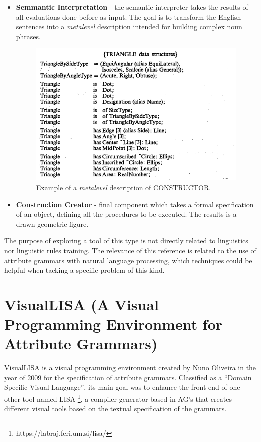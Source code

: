 \begin{itemize}
	\newpage
	\item \textbf{Semmantic Interpretation} - the semantic interpreter takes the results of all evaluations done before as input.
		The goal is to transform the English sentences into a \textit{metalevel} description intended for building complex noun phrases.
		\begin{figure}[h]
			\centering
			\includegraphics[width=12cm]{images/constructor_metalevel_desc.png}
			\caption{Example of a \textit{metalevel} description of CONSTRUCTOR.}
			\label{fig:constructorMetalevelDesc}
		\end{figure}
	
	\item \textbf{Construction Creator} - final component which takes a formal specification of an object, defining all the procedures to be executed.
		The results is a drawn geometric figure.
\end{itemize}

The purpose of exploring a tool of this type is not directly related to linguistics nor linguistic rules training.
The relevance of this reference is related to the use of attribute grammars with natural language processing, which techniques could be helpful when tacking a specific problem of this kind.


\section{VisualLISA (A Visual Programming Environment for Attribute Grammars)}
VisualLISA is a visual programming environment created by Nuno Oliveira in the year of 2009 \cite{oliveira_2009} for the specification of attribute grammars. 
Classified as a ``Domain Specific  Visual Language'', its main goal was to enhance the front-end of one other tool named LISA \footnote{https://labraj.feri.um.si/lisa/}, 
a compiler generator based in AG's that creates different visual tools based on the textual specification of the grammars.
    
